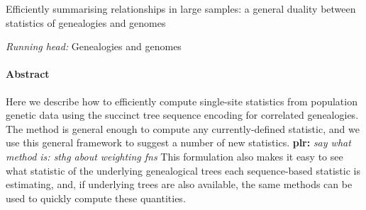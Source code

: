 \documentclass{article}
\newcommand{\plr}[1]{{\color{blue}\textbf{plr:} \it #1}}
\begin{document}
\begin{center}
    Efficiently summarising relationships in large samples:
    a general duality between statistics of genealogies and genomes
\end{center}

\emph{Running head:} Genealogies and genomes


\paragraph{Abstract}
Here we describe how to efficiently compute single-site statistics
from population genetic data using the succinct tree sequence
encoding for correlated genealogies.
The method is general enough to compute any currently-defined statistic,
and we use this general framework to suggest a number of new statistics.
\plr{say what method is: sthg about weighting fns}
This formulation also makes it easy to see what statistic of the underlying genealogical trees
each sequence-based statistic is estimating,
and, if underlying trees are also available,
the same methods can be used to quickly compute these quantities.


%
%
%
%
%
%
%
%
%
\end{document}
